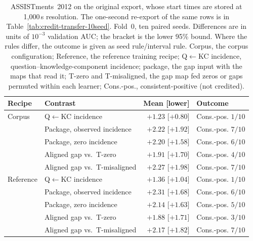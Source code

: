 \begin{table}[H]
\caption{ASSISTments~2012 on the original export, whose start times
are stored at 1{,}000\,s resolution. The one-second re-export of the
same rows is in Table~\ref{tab:credit-transfer-10seed}. Fold~0, ten paired
seeds. Differences are in units of $10^{-3}$ validation AUC; the
bracket is the lower 95\% bound. Where the rules differ, the outcome
is given as seed rule/interval rule. Corpus, the corpus configuration;
Reference, the reference training recipe; Q$\leftarrow$KC incidence,
question--knowledge-component incidence; package, the gap input with
the maps that read it; T-zero and T-misaligned, the gap map fed zeros
or gaps permuted within each learner; Cons.-pos., consistent-positive
(not credited).}
\label{tab:credit-assist-resolution-10seed}
\centering
\scriptsize
\setlength{\tabcolsep}{3pt}
\begin{tabular}{@{}llrl@{}}
\toprule
Recipe & Contrast & Mean [lower] & Outcome \\
\midrule
Corpus & Q$\leftarrow$KC incidence & $+1.23$ [$+0.80$] & Cons.-pos. $1/10$ \\
 & Package, observed incidence & $+2.22$ [$+1.92$] & Cons.-pos. $7/10$ \\
 & Package, zero incidence & $+2.20$ [$+1.58$] & Cons.-pos. $6/10$ \\
 & Aligned gap vs.\ T-zero & $+1.91$ [$+1.70$] & Cons.-pos. $4/10$ \\
 & Aligned gap vs.\ T-misaligned & $+2.27$ [$+1.98$] & Cons.-pos. $7/10$ \\
\addlinespace
Reference & Q$\leftarrow$KC incidence & $+1.36$ [$+1.04$] & Cons.-pos. $1/10$ \\
 & Package, observed incidence & $+2.31$ [$+1.68$] & Cons.-pos. $6/10$ \\
 & Package, zero incidence & $+2.14$ [$+1.63$] & Cons.-pos. $5/10$ \\
 & Aligned gap vs.\ T-zero & $+1.88$ [$+1.71$] & Cons.-pos. $3/10$ \\
 & Aligned gap vs.\ T-misaligned & $+2.17$ [$+1.82$] & Cons.-pos. $7/10$ \\
\bottomrule
\end{tabular}
\end{table}
